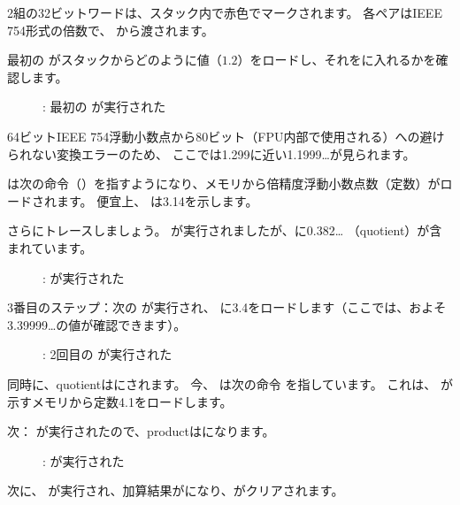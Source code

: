﻿\clearpage
{}
\myindex{\olly}

2組の32ビットワードは、スタック内で赤色でマークされます。
各ペアはIEEE 754形式の倍数で、 \main から渡されます。

最初の \FLD がスタックからどのように値（$1.2$）をロードし、それをに入れるかを確認します。

\begin{figure}[H]
\centering
{}
\caption{\olly: 最初の \FLD が実行された}
\label{fig:FPU_simple_olly_1}
\end{figure}

64ビットIEEE 754浮動小数点から80ビット（FPU内部で使用される）への避けられない変換エラーのため、
ここでは1.299に近い1.1999\ldots が見られます。

\EIP は次の命令（\FDIV）を指すようになり、メモリから倍精度浮動小数点数（定数）がロードされます。
便宜上、 \olly は3.14を示します。

\clearpage
さらにトレースしましょう。 
\FDIV が実行されましたが、に0.382\ldots
（\gls{quotient}）が含まれています。

\begin{figure}[H]
\centering
{}
\caption{\olly: \FDIV が実行された}
\label{fig:FPU_simple_olly_2}
\end{figure}

\clearpage
3番目のステップ：次の \FLD が実行され、
に3.4をロードします（ここでは、およそ3.39999\ldots の値が確認できます）。

\begin{figure}[H]
\centering
{}
\caption{\olly: 2回目の \FLD が実行された}
\label{fig:FPU_simple_olly_3}
\end{figure}

同時に、\gls{quotient}はにされます。
今、 \EIP は次の命令 \FMUL を指しています。
これは、 \olly が示すメモリから定数4.1をロードします。

\clearpage
次： \FMUL が実行されたので、\gls{product}はになります。

\begin{figure}[H]
\centering
{}
\caption{\olly: \FMUL が実行された}
\label{fig:FPU_simple_olly_4}
\end{figure}

\clearpage
次に、 \FADDP が実行され、加算結果がになり、がクリアされます。


